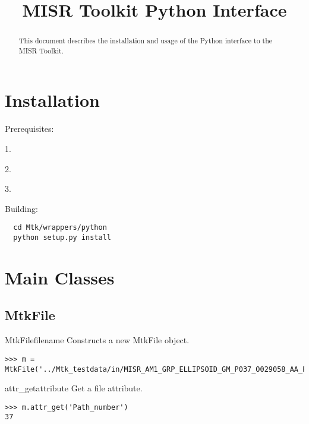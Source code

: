 \documentclass{howto}
\title{MISR Toolkit Python Interface}
\begin{document}
\maketitle

\begin{abstract}
\noindent
This document describes the installation and usage of the Python interface to the MISR Toolkit.

\end{abstract}

\section{Installation \label {installation}}
Prerequisites:

  1. 

  2. 

  3.  
 
Building:
\begin{verbatim}
  cd Mtk/wrappers/python
  python setup.py install
\end{verbatim}

\section{Main Classes \label {core}}

\subsection{MtkFile \label{mtkfile}}

\begin{classdesc}{MtkFile}{filename}
  Constructs a new MtkFile object.

\begin{verbatim}
>>> m = MtkFile('../Mtk_testdata/in/MISR_AM1_GRP_ELLIPSOID_GM_P037_O029058_AA_F03_0024.hdf')
\end{verbatim}
\end{classdesc}

\begin{methoddesc}{attr_get}{attribute}
  Get a file attribute.

\begin{verbatim}
>>> m.attr_get('Path_number')
37
\end{verbatim}
\end{methoddesc}
\end{document}
